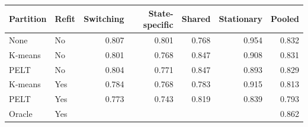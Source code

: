 \begin{tabular}{llrrrrr}
\toprule
Partition & Refit & Switching & State-specific & Shared & Stationary & Pooled \\
\midrule
None & No & 0.807 & 0.801 & 0.768 & 0.954 & 0.832 \\
\midrule
K-means & No & 0.801 & 0.768 & 0.847 & 0.908 & 0.831 \\
PELT & No & 0.804 & 0.771 & 0.847 & 0.893 & 0.829 \\
K-means & Yes & 0.784 & 0.768 & 0.783 & 0.915 & 0.813 \\
PELT & Yes & 0.773 & 0.743 & 0.819 & 0.839 & 0.793 \\
Oracle & Yes & \multicolumn{4}{c}{} & 0.862 \\
\bottomrule
\end{tabular}
